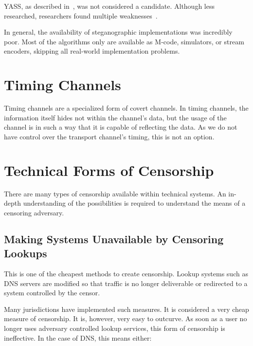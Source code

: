 
YASS, as described in~\cite{solanki2007yass}, was not considered a candidate. Although less researched, researchers found multiple weakness\-es~\cite{kodovsky2010modern,li2009steganalysis}.


In general, the availability of steganographic implementations was incredibly poor. Most of the algorithms only are available as M-code, simulators, or stream encoders, skipping all real-world implementation problems.

\section{Timing Channels}

Timing channels are a specialized form of covert channels. In timing channels, the information itself hides not within the channel's data, but the usage of the channel is in such a way that it is capable of reflecting the data. As we do not have control over the transport channel's timing, this is not an option.

\section{Technical Forms of Censorship}
There are many types of censorship available within technical systems. An in-depth understanding of the possibilities is required to understand the means of a censoring adversary.

\subsection{Making Systems Unavailable by Censoring Lookups}
This is one of the cheapest methods to create censorship. Lookup systems such as DNS servers are modified so that traffic is no longer deliverable or redirected to a system controlled by the censor.

Many jurisdictions have implemented such measures. It is considered a very cheap measure of censorship. It is, however, very easy to outcurve. As soon as a user no longer uses adversary controlled lookup services, this form of censorship is ineffective. In the case of DNS, this means either: 

